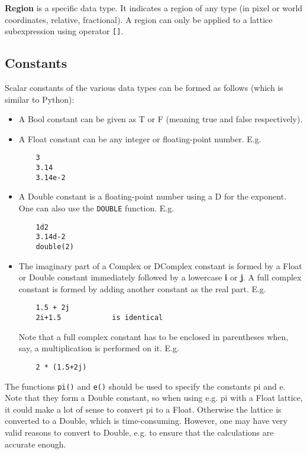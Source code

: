 \textbf{Region} is a specific data type. It indicates a region of any type
(in pixel or world coordinates, relative, fractional).
A region can only be applied to a lattice subexpression using
operator \texttt{[]}.


\subsection{\label{LEL:CONSTANTS}Constants}
Scalar constants of the various data types can be formed as follows
(which is similar to Python):
\begin{itemize}
  \item A Bool constant can be given as T or F
        (meaning true and false respectively).
  \item A Float constant can be any integer or floating-point number. E.g.
    \begin{verbatim}
    3
    3.14
    3.14e-2
    \end{verbatim}
  \item A Double constant is a floating-point number using a D for the
    exponent. One can also use the \texttt{DOUBLE} function. E.g.
    \begin{verbatim}
    1d2
    3.14d-2
    double(2)
    \end{verbatim}
  \item The imaginary part of a Complex or DComplex constant is formed
    by a Float or Double constant immediately followed by a lowercase
    \textbf{i} or \textbf{j}. A full complex
    constant is formed by adding another constant as the
    real part. E.g.
    \begin{verbatim}
    1.5 + 2j
    2i+1.5            is identical
    \end{verbatim}
    Note that a full complex constant has to be enclosed
    in parentheses when, say, a multiplication is performed on it. E.g.
    \begin{verbatim}
    2 * (1.5+2j)
    \end{verbatim}
\end{itemize}
The functions \texttt{pi()} and \texttt{e()} should be
used to specify the constants pi and e. Note that they form a Double constant,
so when using e.g. pi with a Float lattice, it could make a lot of sense
to convert pi to a Float. Otherwise the lattice is converted to a
Double, which is time-consuming. However, one may have very valid
reasons to convert to Double, e.g. to ensure that the calculations are
accurate enough.

